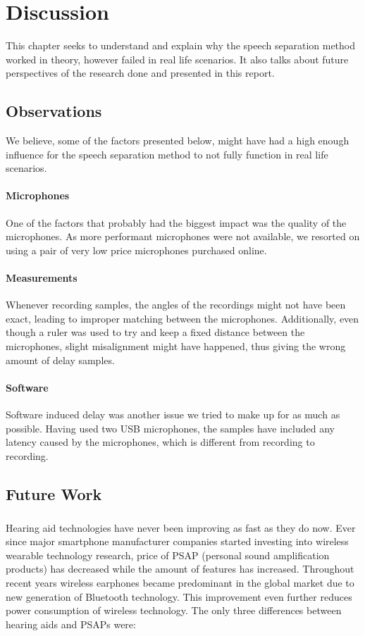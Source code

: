 \chapter{Discussion}\label{ch:discussion}
This chapter seeks to understand and explain why the speech separation method worked in theory,
however failed in real life scenarios.
It also talks about future perspectives of the research done and presented in this report.
\section{Observations}
We believe, some of the factors presented below, might have had a high enough influence for the speech 
separation method to not fully function in real life scenarios.
\subsubsection{Microphones}
One of the factors that probably had the biggest impact was the quality of the microphones. As more
performant microphones were not available, we resorted on using a pair of very low price microphones
purchased online.
\subsubsection{Measurements}
Whenever recording samples, the angles of the recordings might not have been exact, leading to improper 
matching between the microphones. Additionally, even though a ruler was used to try and keep a fixed 
distance between the microphones, slight misalignment might have happened, thus giving the wrong
amount of delay samples.
\subsubsection{Software}
Software induced delay was another issue we tried to make up for as much as possible. Having used two USB 
microphones, the samples have included any latency caused by the microphones, which is different from 
recording to recording. 


\section{Future Work}
\paragraph{}
Hearing aid technologies have never been improving as fast as they do now. Ever since major smartphone manufacturer companies started investing into wireless wearable technology research, price of PSAP (personal sound amplification products) has decreased while the amount of features has increased. Throughout recent years wireless earphones became predominant in the global market due to new generation of Bluetooth technology. This improvement even further reduces power consumption of wireless technology. The only three differences between hearing aids and PSAPs were: \\

